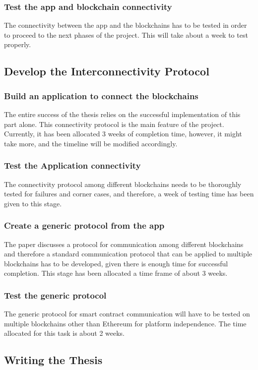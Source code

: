 \documentclass[a4paper,twoside,phd]{BYUPhys}
\begin{document}
\subsubsection{Test the app and blockchain connectivity}
The connectivity between the app and
the blockchains has to be tested in order to proceed to the next phases of the project.
This will take about a week to test properly.
\subsection{Develop the Interconnectivity Protocol}
\subsubsection{Build an application to connect the blockchains}
The entire success of the thesis
relies on the successful implementation of this part alone. This connectivity protocol is the main feature of the project. Currently, it has been allocated 3 weeks of completion time, however, it might take more, and the timeline will be modified accordingly.
\subsubsection{Test the Application connectivity}
The connectivity protocol among different blockchains needs to be thoroughly tested for failures and corner cases, and therefore, a week of testing time has been given to this stage.
\subsubsection{Create a generic protocol from the app}
The paper discusses a protocol for communication among different blockchains and therefore a standard communication protocol that can be applied to multiple blockchains has to be developed, given there is enough time for successful completion. This stage has been allocated a time frame of about 3 weeks.
\subsubsection{Test the generic protocol}
The generic protocol for smart contract communication will have to be tested on multiple blockchains other than Ethereum for platform independence. The time allocated for this task is about 2 weeks.
\subsection{Writing the Thesis}
\end{document}
